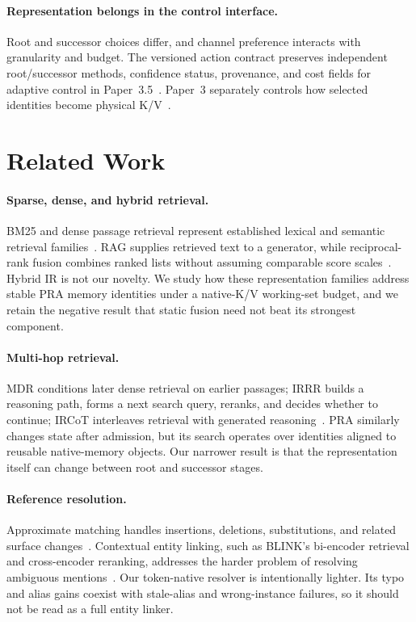 \documentclass[11pt]{article}
\begin{document}
\paragraph{Representation belongs in the control interface.}
Root and successor choices differ, and channel preference interacts with granularity and budget. The versioned action contract preserves independent root/successor methods, confidence status, provenance, and cost fields for adaptive control in Paper~3.5~\cite{simao2026adaptive}. Paper~3 separately controls how selected identities become physical K/V~\cite{simao2026materialization}.

\section{Related Work}
\paragraph{Sparse, dense, and hybrid retrieval.}
BM25 and dense passage retrieval represent established lexical and semantic retrieval families~\cite{robertson2009bm25,karpukhin2020dpr}. RAG supplies retrieved text to a generator, while reciprocal-rank fusion combines ranked lists without assuming comparable score scales~\cite{lewis2020rag,cormack2009rrf}. Hybrid IR is not our novelty. We study how these representation families address stable PRA memory identities under a native-K/V working-set budget, and we retain the negative result that static fusion need not beat its strongest component.

\paragraph{Multi-hop retrieval.}
MDR conditions later dense retrieval on earlier passages; IRRR builds a reasoning path, forms a next search query, reranks, and decides whether to continue; IRCoT interleaves retrieval with generated reasoning~\cite{xiong2021mdr,qi2021irrr,trivedi2023ircot}. PRA similarly changes state after admission, but its search operates over identities aligned to reusable native-memory objects. Our narrower result is that the representation itself can change between root and successor stages.

\paragraph{Reference resolution.}
Approximate matching handles insertions, deletions, substitutions, and related surface changes~\cite{navarro2001approx}. Contextual entity linking, such as BLINK's bi-encoder retrieval and cross-encoder reranking, addresses the harder problem of resolving ambiguous mentions~\cite{wu2020blink}. Our token-native resolver is intentionally lighter. Its typo and alias gains coexist with stale-alias and wrong-instance failures, so it should not be read as a full entity linker.
\end{document}

